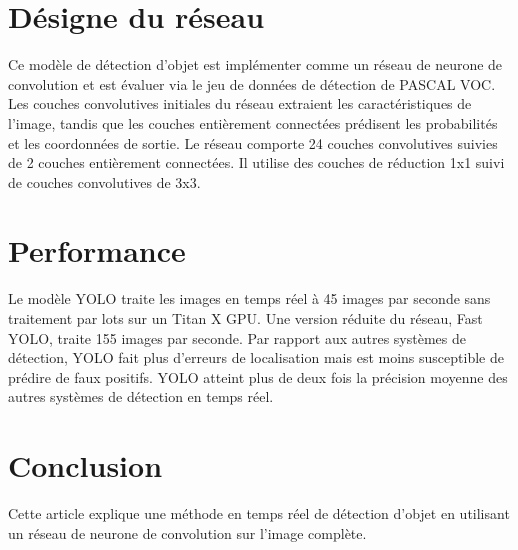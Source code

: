 \documentclass[11pt]{report}
\begin{document}
\section{Désigne du réseau}
Ce modèle de détection d'objet est implémenter comme un réseau de neurone de convolution et est évaluer via le jeu de données de détection de PASCAL VOC.
Les couches convolutives initiales du réseau extraient les caractéristiques de l'image, tandis que les couches entièrement connectées prédisent les probabilités et les coordonnées de sortie. Le réseau comporte 24 couches convolutives suivies de 2 couches entièrement connectées. Il utilise des couches de réduction 1x1 suivi de couches convolutives de 3x3. 



\section{Performance}
Le modèle YOLO traite les images en temps réel à 45 images par seconde  sans traitement par lots sur un Titan X GPU. Une version réduite du réseau, Fast YOLO, traite 155 images par seconde. Par rapport aux autres systèmes de détection, YOLO fait plus d'erreurs de localisation mais est moins susceptible de prédire de faux positifs. YOLO atteint plus de deux fois la précision moyenne des
autres systèmes de détection en temps réel.

\section{Conclusion}
Cette article explique une méthode en temps réel de détection d'objet en utilisant un réseau de neurone de convolution sur l'image complète. 

\end{document}
